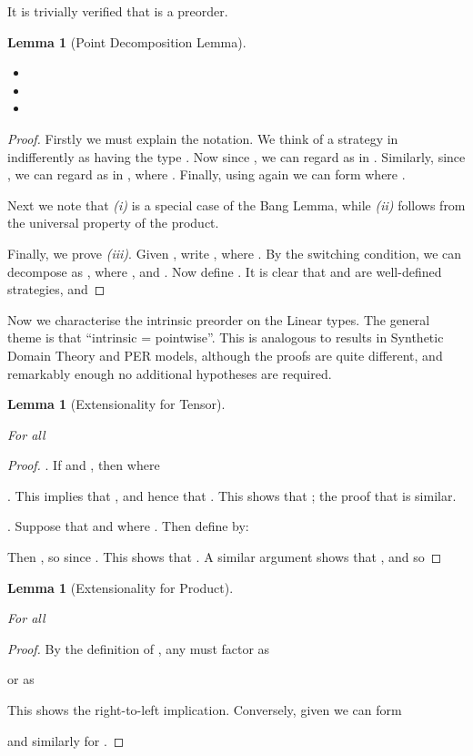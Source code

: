 \documentclass[11pt]{article}
\newtheorem{lemma}[theorem]{Lemma}
\begin{document}
It is trivially verified that  is a preorder.
\begin{lemma}[Point Decomposition Lemma]\label{PDL}

\begin{itemize}
\item[(i)] 
\item[(ii)] 
\item[(iii)]
\end{itemize}
\end{lemma}
\begin{proof} Firstly we must explain the notation. We think of a
strategy  in  indifferently as having the type . Now since , we can regard
 as in . Similarly, since
, we can regard  as in , where . Finally, using  again we can form
 where
.


Next we note that {\it (i)} is a special case of the Bang Lemma, while {\it (ii)}
follows from the universal property of the product.

Finally, we prove {\it (iii)}. Given , write
, where . By the
switching condition, we can decompose  as , where
, and . Now
define . It is clear that  and  are
well-defined strategies, and

\end{proof}

Now we characterise the intrinsic preorder on the Linear types. The
general theme is that ``intrinsic = pointwise''. This is analogous to
results in Synthetic Domain Theory and PER models, although the proofs
are quite different, and remarkably enough no additional hypotheses
are required.
\begin{lemma}[Extensionality for Tensor]\label{EfT}

For all 

\end{lemma}
\begin{proof} . If  and , then  where


\noindent . This implies that , and hence that . This shows
that ; the proof that  is similar.

. Suppose that  and  where . Then define  by:




Then , so
 since .
This shows that . A similar
argument shows that , and
so 
\end{proof}

\begin{lemma}[Extensionality for Product]\label{EfP}

For all 

\end{lemma}
\begin{proof} By the definition of , any  must factor as

or as

This shows the right-to-left implication. Conversely, given
 we can form

and similarly for .
\end{proof}
\end{document}
